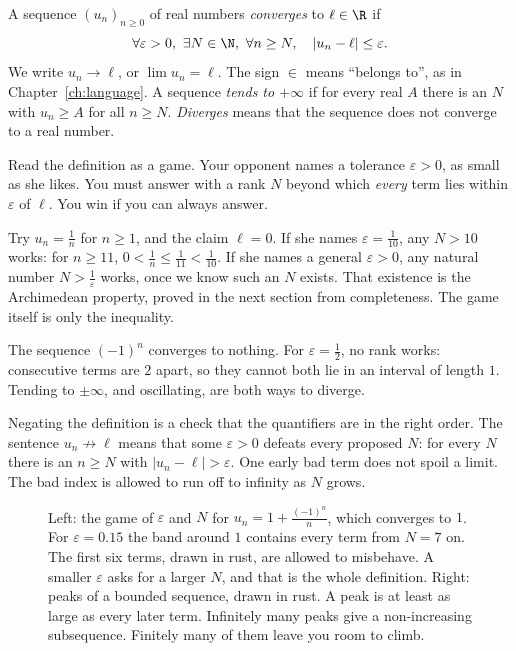 \begin{definitionx}
A sequence $(u_n)_{n\ge0}$ of real numbers \emph{converges} to $\ell\in\R$ if
\[
\forall\varepsilon>0,\ \exists N\in\N,\ \forall n\ge N,\quad|u_n-\ell|\le\varepsilon.
\]
We write $u_n\to\ell$, or $\lim u_n=\ell$. The sign $\in$ means ``belongs to'', as in Chapter~\ref{ch:language}. A sequence \emph{tends to $+\infty$} if for every real $A$ there is an $N$ with $u_n\ge A$ for all $n\ge N$. \emph{Diverges} means that the sequence does not converge to a real number.
\end{definitionx}

Read the definition as a game. Your opponent names a tolerance $\varepsilon>0$, as small as she likes. You must answer with a rank $N$ beyond which \emph{every} term lies within $\varepsilon$ of $\ell$. You win if you can always answer.

Try $u_n=\frac1n$ for $n\ge1$, and the claim $\ell=0$. If she names $\varepsilon=\frac1{10}$, any $N>10$ works: for $n\ge11$, $0<\frac1n\le\frac1{11}<\frac1{10}$. If she names a general $\varepsilon>0$, any natural number $N>\frac1\varepsilon$ works, once we know such an $N$ exists. That existence is the Archimedean property, proved in the next section from completeness. The game itself is only the inequality.

The sequence $(-1)^n$ converges to nothing. For $\varepsilon=\frac12$, no rank works: consecutive terms are $2$ apart, so they cannot both lie in an interval of length $1$. Tending to $\pm\infty$, and oscillating, are both ways to diverge.

Negating the definition is a check that the quantifiers are in the right order. The sentence $u_n\not\to\ell$ means that some $\varepsilon>0$ defeats every proposed $N$: for every $N$ there is an $n\ge N$ with $|u_n-\ell|>\varepsilon$. One early bad term does not spoil a limit. The bad index is allowed to run off to infinity as $N$ grows.


\begin{figure}[ht]
\centering
{}
\caption{Left: the game of $\varepsilon$ and $N$ for $u_n=1+\frac{(-1)^n}{n}$, which converges to $1$. For $\varepsilon=0.15$ the band around $1$ contains every term from $N=7$ on. The first six terms, drawn in rust, are allowed to misbehave. A smaller $\varepsilon$ asks for a larger $N$, and that is the whole definition. Right: peaks of a bounded sequence, drawn in rust. A peak is at least as large as every later term. Infinitely many peaks give a non-increasing subsequence. Finitely many of them leave you room to climb.}
\label{fig:epsilon}
\end{figure}

